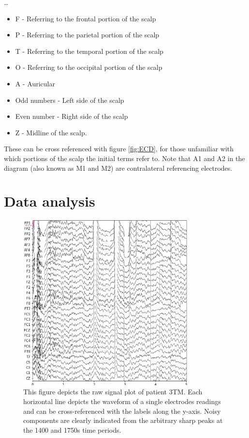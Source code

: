 \documentclass[11pt]{article}
\begin{document}
\dots
\begin{itemize}
\item F - Referring to the frontal portion of the scalp
\item P - Referring to the parietal portion of the scalp
\item T - Referring to the temporal portion of the scalp
\item O - Referring to the occipital portion of the scalp
\item A - Auricular
\item Odd numbers - Left side of the scalp
\item Even number - Right side of the scalp
\item Z - Midline of the scalp. 
\end{itemize}

These can be cross referenced with figure \ref{fig:ECD}, for those unfamiliar with which portions of the scalp the initial terms refer to. Note that A1 and A2 in the diagram (also known as M1 and M2) are contralateral referencing electrodes. 

\section{Data analysis}

\begin{figure}[tb]
\centering
\includegraphics[width=0.8\textwidth]{RawPlot.png}
\caption{\label{fig:RawPlot} This figure depicts the raw signal plot of patient 3TM. Each horizontal line depicts the waveform of a single electrodes readings and can be cross-referenced with the labels along the y-axis. Noisy components are clearly indicated from the arbitrary sharp peaks at the 1400 and 1750s time periods.}
\end{figure} 
\end{document}
